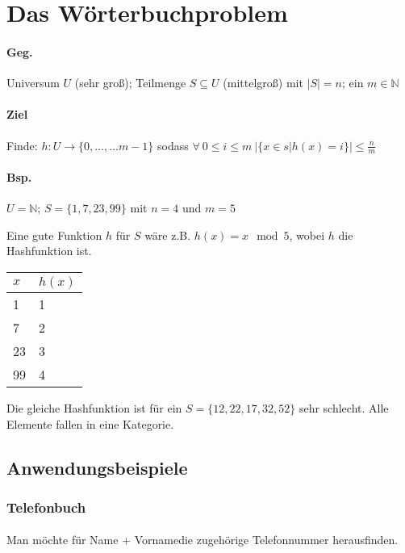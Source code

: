 \section{Das Wörterbuchproblem}

\paragraph*{Geg.} Universum $U$ (sehr groß); Teilmenge $S \subseteq U$ (mittelgroß) mit $|S|=n$; ein $m \in \mathbb{N}$

\paragraph*{Ziel} Finde: $h: U \rightarrow \{ 0,\dots,\dots m-1 \}$ sodass $\forall\ 0 \leq i \leq m\ \big| \{ x \in s | h(x)=i \} \big| \leq \frac{n}{m}$

\paragraph*{Bsp.} $U=\mathbb{N}$; $S=\{ 1,7,23,99 \}$ mit $n=4$ und $m=5$

Eine gute Funktion $h$ für $S$ wäre z.B. $h(x)=x \mod 5$, wobei $h$ die Hashfunktion ist.
\begin{table}[htb!]
\centering
\begin{tabular}{l|l}
$x$ & $h(x)$ \\ 
\hline 
1 & 1 \\ 
7 & 2 \\ 
23 & 3 \\ 
99 & 4 \\ 
\end{tabular} 
\end{table}

Die gleiche Hashfunktion ist für ein $S = \{ 12,22,17,32,52 \}$ sehr schlecht. Alle Elemente fallen in eine Kategorie.


\subsection{Anwendungsbeispiele}

\subsubsection{Telefonbuch}
\paragraph*{} Man möchte für Name + Vornamedie zugehörige Telefonnummer herausfinden.

